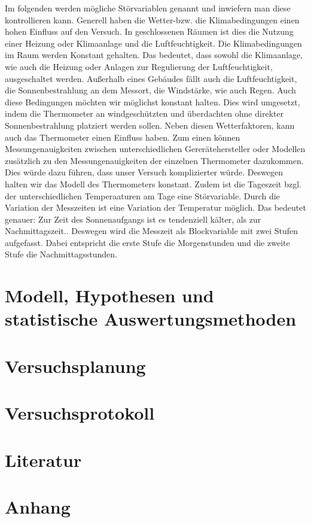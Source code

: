 \documentclass[ ngerman, fontsize= 12pt, paper=a4, headings=big, titlepage=true]{article}
\begin{document}
Im folgenden werden mögliche Störvariablen genannt und inwiefern man diese kontrollieren kann. Generell haben die Wetter-bzw. die Klimabedingungen einen hohen Einfluss auf den Versuch.  In geschlossenen Räumen ist dies die Nutzung einer Heizung oder Klimaanlage und die Luftfeuchtigkeit. Die Klimabedingungen im Raum werden Konstant gehalten. Das bedeutet, dass sowohl die Klimaanlage, wie auch die Heizung oder Anlagen zur Regulierung der Luftfeuchtigkeit, ausgeschaltet werden. Außerhalb eines Gebäudes fällt auch die Luftfeuchtigkeit, die Sonnenbestrahlung an dem Messort, die Windstärke, wie auch Regen. Auch diese Bedingungen möchten wir möglichst konstant halten. Dies wird umgesetzt, indem die Thermometer an windgeschützten und überdachten ohne direkter Sonnenbestrahlung platziert werden sollen. Neben diesen Wetterfaktoren, kann auch das Thermometer einen Einfluss haben. Zum einen können Messungenauigkeiten zwischen unterschiedlichen Gererätehersteller oder Modellen zusätzlich zu den Messungenauigkeiten der einzelnen Thermometer dazukommen. Dies würde dazu führen, dass unser Versuch komplizierter würde. Deswegen halten wir das Modell des Thermometers konstant. Zudem ist die Tageszeit bzgl. der unterschiedlichen Temperaaturen am Tage eine Störvariable. Durch die Variation der Messzeiten ist eine Variation der Temperatur möglich. Das bedeutet genauer: Zur Zeit des Sonnenaufgangs ist es tendenziell kälter, als zur Nachmittagszeit.\cite{WK2}. Deswegen wird die Messzeit als Blockvariable mit zwei Stufen aufgefasst. Dabei  entspricht die erste Stufe die Morgenstunden und die zweite Stufe die Nachmittagsstunden. 



\section{Modell, Hypothesen und statistische Auswertungsmethoden}
\section{Versuchsplanung}
\section{Versuchsprotokoll}

\section{Literatur}
 



\section{Anhang}
	
	
	
\end{document}
